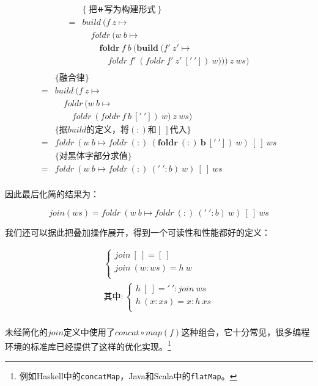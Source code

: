 \documentclass[b5paper]{ctexart}
\begin{document}
\begin{example}
\[\begin{array}{rl}
  & \{\text{把$\doubleplus$写为构建形式}\} \\
= & build\ (f\ z \mapsto \\
  & \quad foldr\ (w\ b \mapsto \\
  & \quad \quad \pmb{foldr}\ f\ b\ (\pmb{build}\ (f'\ z' \mapsto \\
  & \quad \quad \quad foldr\ f'\ (foldr\ f'\ z'\ ['\ '])\ w)))\ z\ ws) \\
\end{array}
\]
\[ \begin{array}{rl}
  & \{\text{融合律}\} \\
= & build\ (f\ z \mapsto \\
  & \quad foldr\ (w\ b \mapsto \\
  & \quad \quad foldr\ (foldr\ f\ b\ ['\ '])\ w)\ z\ ws) \\

  & \{\text{据$build$的定义，将$(:)$和$[\ ]$代入}\} \\
= & foldr\ (w\ b \mapsto foldr\ (:)\ \pmb{(foldr\ (:)\ b\ ['\ '])}\ w)\ [\ ]\ ws \\

  & \{\text{对黑体字部分求值}\} \\
= & foldr\ (w\ b \mapsto foldr\ (:)\ ('\ ' : b)\ w)\ [\ ]\ ws \\
\end{array} \]

因此最后化简的结果为：

\[
join(ws) = foldr\ (w\ b \mapsto foldr\ (:)\ ('\ ' : b)\ w)\ [\ ]\ ws
\]

我们还可以据此把叠加操作展开，得到一个可读性和性能都好的定义：

\[
\begin{array}{l}
\begin{cases}
join\ [\ ] = [\ ] \\
join\ (w:ws) = h\ w \\
\end{cases} \\
\text{其中}: \begin{cases}
             h\ [\ ] = '\ ' : join\ ws \\
             h\ (x:xs) = x : h\ xs \\
             \end{cases} \\
\end{array}
\]

 
未经简化的$join$定义中使用了$concat \circ map(f)$这种组合，它十分常见，很多编程环境的标准库已经提供了这样的优化实现。\footnote{例如Haskell中的\texttt{concatMap}，Java和Scala中的\texttt{flatMap}。}
\end{example}
\end{document}
